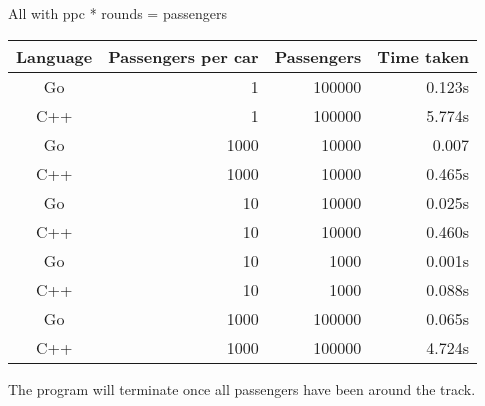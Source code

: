 \documentclass[11pt]{article}
\begin{document}
All with ppc * rounds = passengers

\begin{tabular}{c r r r}
Language    & Passengers per car & Passengers & Time taken \\
\toprule
Go 			& 1 & 100000 & 0.123s \\
C++         & 1 & 100000 & 5.774s \\
\cmidrule{1-4}
Go 			& 1000 & 10000 & 0.007 \\
C++         & 1000 & 10000 & 0.465s \\
\cmidrule{1-4}
Go 			& 10 & 10000 & 0.025s \\
C++         & 10 & 10000 & 0.460s \\
\cmidrule{1-4}
Go 			& 10 & 1000 & 0.001s \\
C++         & 10 & 1000 & 0.088s \\
\cmidrule{1-4}
Go 			& 1000 & 100000 & 0.065s \\
C++         & 1000 & 100000 & 4.724s \\
\end{tabular}
\newline
The program will terminate once all passengers have been around the track.
\end{document}
